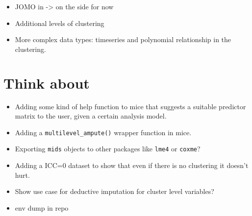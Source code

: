 \documentclass[
]{jss}
\begin{document}
\begin{itemize}
\item
  JOMO in  -\textgreater{} on the side for now
\item
  Additional levels of clustering
\item
  More complex data types: timeseries and polynomial relationship in the
  clustering.
\end{itemize}

\hypertarget{think-about}{%
\section{Think about}\label{think-about}}

\begin{itemize}
\item
  Adding some kind of help function to mice that suggests a suitable
  predictor matrix to the user, given a certain analysis model.
\item
  Adding a \texttt{multilevel\_ampute()} wrapper function in mice.
\item
  Exporting \texttt{mids} objects to other packages like \texttt{lme4}
  or \texttt{coxme}?
\item
  Adding a ICC=0 dataset to show that even if there is no clustering it
  doesn't hurt.
\item
  Show use case for deductive imputation for cluster level variables?
\item
  env dump in repo
\end{itemize}

\renewcommand\refname{References}

\end{document}

